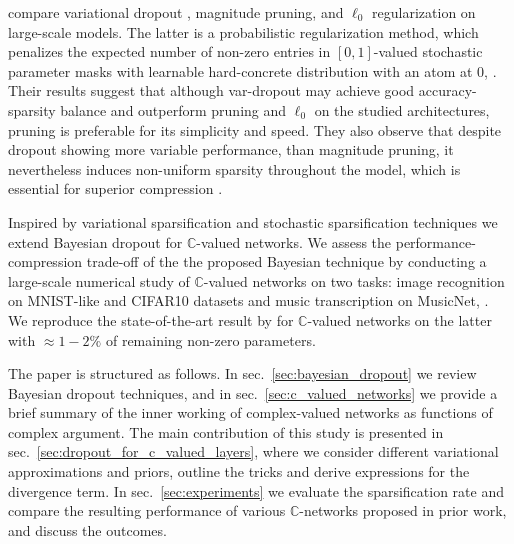 \documentclass[a4paper,10pt]{article}
\newcommand{\cplx}{\mathbb{C}}
\begin{document}
\citet{gale_state_2019} compare variational dropout \citep{kingma_variational_2015},
magnitude pruning, and $\ell_0$ regularization \citep{louizos_learning_2017} on large-scale
models. The latter is a probabilistic regularization method, which penalizes the expected
number of non-zero entries in $[0, 1]$-valued stochastic parameter masks with learnable
hard-concrete distribution with an atom at $0$, \citep{maddison_concrete_2016,jang_categorical_2017}.
Their results suggest that although var-dropout may achieve good accuracy-sparsity balance
and outperform pruning and $\ell_0$ on the studied architectures, pruning is preferable for
its simplicity and speed. They also observe that despite dropout showing more variable
performance, than magnitude pruning, it nevertheless induces non-uniform sparsity throughout
the model, which is essential for superior compression \citep{he_amc:_2018}.
%
%

Inspired by variational sparsification and stochastic sparsification techniques we
extend Bayesian dropout for $\cplx$-valued networks. We assess the performance-compression
trade-off of the the proposed Bayesian technique by conducting a large-scale numerical
study of $\cplx$-valued networks on two tasks: image recognition on MNIST-like and CIFAR10
datasets and music transcription on MusicNet, \citep{thickstun_learning_2017}. We reproduce
the state-of-the-art result by \citet{trabelsi_deep_2017} for $\cplx$-valued networks on
the latter with $\approx 1-2\%$ of remaining non-zero parameters.

The paper is structured as follows. In sec.~\ref{sec:bayesian_dropout} we review Bayesian
dropout techniques, and in sec.~\ref{sec:c_valued_networks} we provide a brief summary of
the inner working of complex-valued networks as functions of complex argument. The main
contribution of this study is presented in sec.~\ref{sec:dropout_for_c_valued_layers},
where we consider different variational approximations and priors, outline the tricks
and derive expressions for the divergence term. In sec.~\ref{sec:experiments} we evaluate
the sparsification rate and compare the resulting performance of various $\cplx$-networks
proposed in prior work, and discuss the outcomes.
\end{document}
